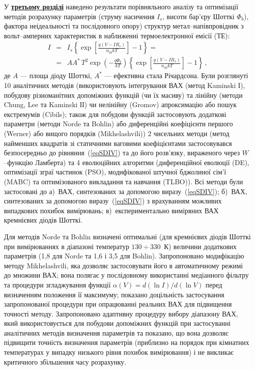 У  \underline{\textbf{третьому розділі}} наведено результати порівняльного аналізу та оптимізації методів розрахунку параметрів (струму насичення  $I_s$, висоти бар'єру Шотткі  $\Phi_b$), фактора неідеальності та послідовного опору) структур метал--напівпровідник з вольт--амперних характеристик в наближенні термоелектронної емісії (ТЕ):
\begin{eqnarray}
\label{eqSDIV}
\nonumber I&=&I_s\left\{\exp\left[\frac{q(V-IR_s)}{n_\mathrm{id}kT}\right]-1\right\}=\\
&=&AA^*\,T^2\exp\left(-\frac{q\Phi_b}{kT}\right)\left\{\exp\left[\frac{q(V-IR_s)}{n_\mathrm{id}kT}\right]-1\right\}\,,
\end{eqnarray}
де
$A$ --- площа діоду Шотткі,
$A^*$ --- ефективна стала Річардсона.
Були розглянуті 10 аналітичних методів (використовують інтегрування ВАХ (метод Kaminski І), побудову різноманітних допоміжних функцій (чи їх масиву) та лінійну (методи Chung, Lee та Kaminski ІІ) чи нелінійну (Gromov) апроксимацію або пошук екстремумів (Cibils);
також для побудови функцій застосовують додаткові параметри (методи Norde та Bohlin) або диференційні коефіцієнти першого (Werner) або вищого порядків (Mikhelashvili))
2 чисельних методи (метод найменших квадратів зі статичними ваговими коефіцієнтами застосовувався безпосередньо до рівняння~(\ref{eqSDIV}) та до його розв'язку, вираженого через $W$--функцію Ламберта) та
4 еволюційних алгоритми (диференційної еволюції (DE),
оптимізації зграї частинок (PSO),
модифікованої штучної бджолиної сім'ї (MABC) та
оптимізованого викладання та навчання (TLBO)).
Всі методи були застосовані до
а)~ВАХ, синтезованих за допомогою виразу~(\ref{eqSDIV});
б)~ВАХ, синтезованих за допомогою виразу~(\ref{eqSDIV}) з врахуванням можливих випадкових похибок вимірювань;
в)~експериментально виміряних ВАХ кремнієвих діодів Шотткі.

Для методів Norde та Bohlin визначені  оптимальні (для кремнієвих діодів Шотткі при вимірюваннях в діапазоні температур $130\div330$~К) величини додаткових параметрів (1,8 для Norde та 1,6 і 3,5 для Bohlin).
Запропоновано модифікацію методу Mikhelashvili, яка дозволяє застосовувати його в автоматичному режимі до множини ВАХ;
вона полягає у послідовному використанні медіанного фільтру та процедури згладжування функції $\alpha(V)=d(\ln I)/d(\ln V)$ перед визначенням положення її максимуму;
показано доцільність застосування запропонованої процедури при опрацюванні реальних ВАХ для підвищення точності методу.
Запропоновано адаптивну процедуру вибору діапазону ВАХ, який використовується для побудови допоміжних функцій при застосуванні аналітичних методів визначення параметрів та показано, що вона дозволяє підвищити точність визначення параметрів (приблизно на порядок при кімнатних температурах у випадку низького рівня похибок вимірювання) і не викликає критичного збільшення часу розрахунку.

